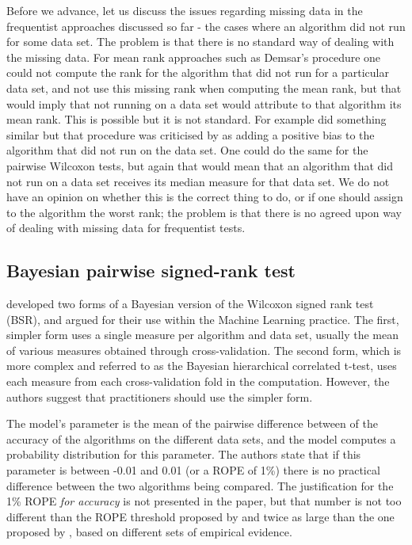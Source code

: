 \documentclass[twoside,11pt,preprint]{article}
\begin{document}
Before we advance, let us discuss the issues
regarding missing data in the frequentist approaches discussed so
far - the cases where an algorithm did not run for some data set. The
problem is that there is no standard way of dealing with the missing
data. For mean rank approaches such as Demsar's procedure one could
not compute the rank for the algorithm that did not run for a
particular data set, and not use this missing rank when computing the
mean rank, but that would imply that not running on a data set would
attribute to that algorithm its mean rank. This is possible but it is
not standard. For example \citet{fernandez2014we} did something similar but
that procedure was criticised by \citet{wainberg2016random} as adding a
positive bias to the algorithm that did not run on the data set. One could do the same
for the pairwise Wilcoxon tests, but again that would mean that an
algorithm that did not run on a data set receives its median measure
for that data set. We do not have an opinion on whether this is the
correct thing to do, or if one should assign to the algorithm the
worst rank; the problem is that there is no agreed upon way of dealing
with missing data for frequentist tests.

\hypertarget{bayesian-pairwise-signed-rank-test}{%
\subsection{\texorpdfstring{Bayesian pairwise signed-rank test \label{sec:bsr}}{Bayesian pairwise signed-rank test }}\label{bayesian-pairwise-signed-rank-test}}

\citet{benavoli2017time} developed two forms of a Bayesian version of the
Wilcoxon signed rank test (BSR), and argued for their use within the
Machine Learning practice. The first, simpler form uses a single measure per algorithm and data set, usually the mean of various measures obtained through cross-validation. The second form, which is more complex and referred to as the Bayesian hierarchical correlated t-test, uses each measure from each cross-validation fold in the computation. However, the authors suggest that practitioners should use the simpler form.

The model's parameter is the mean of the pairwise difference between
of the accuracy of the algorithms on the different data sets, and the model
computes a probability distribution for this parameter. The authors state
that if this parameter is between -0.01 and 0.01 (or a ROPE of 1\%)
there is no practical difference between the two algorithms being
compared. The justification for the 1\% ROPE \emph{for accuracy} is not
presented in the paper, but that number is not too different than the
ROPE threshold proposed by \citet{wainer2016} and twice as large than the one proposed by
\citet{WAINER2021115222}, based on different sets of empirical evidence.
\end{document}
